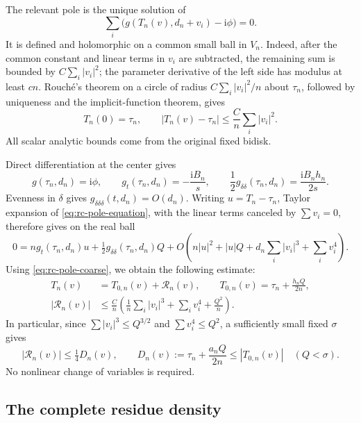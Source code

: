 \documentclass[11pt]{article}
\numberwithin{equation}{section}
\theoremstyle{definition}
\newcommand{\ii}{\mathrm i}
\begin{document}
The relevant pole is the unique solution of
\begin{equation}\label{eq:rc-pole-equation}
 \sum_i\bigl(g(T_n(v),d_n+v_i)-\ii\phi\bigr)=0.
\end{equation}
It is defined and holomorphic on a common small ball in $V_n$.
Indeed, after the common constant and linear terms in $v_i$ are
subtracted, the remaining sum is bounded by $C\sum_i|v_i|^2$;
the parameter derivative of the left side has modulus at least $cn$.
Rouch\'e's theorem on a circle of radius
$C\sum_i|v_i|^2/n$ about $\tau_n$, followed by uniqueness and the
implicit-function theorem, gives
\begin{equation}\label{eq:rc-pole-coarse}
 T_n(0)=\tau_n,\qquad
 |T_n(v)-\tau_n|\le\frac Cn\sum_i|v_i|^2.
\end{equation}
All scalar analytic bounds come from the original fixed bidisk.

Direct differentiation at the center gives
\[
 g(\tau_n,d_n)=\ii\phi,\qquad
 g_t(\tau_n,d_n)=-\frac{\ii B_n}{s},\qquad
 \frac12g_{\delta\delta}(\tau_n,d_n)=\frac{\ii B_nh_n}{2s}.
\]
Evenness in $\delta$ gives $g_{\delta\delta\delta}(t,d_n)=O(d_n)$.
Writing $u=T_n-\tau_n$, Taylor expansion of
\eqref{eq:rc-pole-equation}, with the linear terms canceled by
$\sum v_i=0$, therefore gives on the real ball
\[
 0=ng_t(\tau_n,d_n)u+\tfrac12g_{\delta\delta}(\tau_n,d_n)Q
 +O\left(n|u|^2+|u|Q+d_n\sum_i|v_i|^3+\sum_i v_i^4\right).
\]
Using \eqref{eq:rc-pole-coarse}, we obtain the following estimate:
\begin{equation}\label{eq:rc-pole-error}
 \begin{split}
 T_n(v)&=T_{0,n}(v)+\mathcal R_n(v),\qquad
 T_{0,n}(v)=\tau_n+\frac{h_nQ}{2n},\\
 |\mathcal R_n(v)|&\le\frac Cn\left(
       \frac1n\sum_i|v_i|^3+\sum_i v_i^4+\frac{Q^2}{n}\right).
 \end{split}
\end{equation}
In particular, since $\sum|v_i|^3\le Q^{3/2}$ and
$\sum v_i^4\le Q^2$, a sufficiently small fixed $\sigma$ gives
\begin{equation}\label{eq:rc-small-error}
 |\mathcal R_n(v)|\le\tfrac14D_n(v),\qquad
 D_n(v):=\tau_n+\frac{a_nQ}{2n}\le |T_{0,n}(v)|
 \quad(Q<\sigma).
\end{equation}
No nonlinear change of variables is required.

\subsection{The complete residue density}
\end{document}
